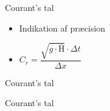 \begin{frame}{Courant's tal}{}
\vfill\vfill\centering

\begin{itemize}
	\item<1-> Indikation af præcision  
	\item<2-> $C_r =  \dfrac{\sqrt{g \cdot \overline{\text{H}}} \cdot \Delta t}{\Delta x}$ 
\end{itemize}

\vfill\vfill		
\end{frame}



\begin{frame}{Courant's tal}{}
\vfill\vfill\centering
\begin{figure}[H]
  
\end{figure}
\vfill\vfill		
\end{frame}

\begin{frame}{Courant's tal}{}
\vfill\vfill\centering
\begin{figure}[H]
  
\end{figure}
\vfill\vfill		
\end{frame}


